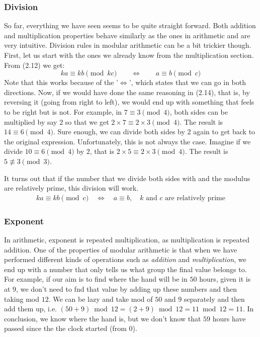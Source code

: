 \subsubsection{Division}
So far, everything we have seen seems to be quite straight forward. Both addition and multiplication properties behave similarly as the ones in arithmetic and are very intuitive. Division rules in modular arithmetic can be a bit trickier though. First, let us start with the ones we already know from the multiplication section.
From (2.12) we get:
\begin{equation}
ka\equiv kb \pmod {kc} \qquad  \iff  \qquad  a \equiv b  \pmod {c}
\end{equation}
Note that this works because of the '$\iff$', which states that we can go in both directions. Now, if we would have done the same reasoning in (2.14), that is, by reversing it (going from right to left), we would end up with something that feels to be right but is not. For example, in $7\equiv3 \pmod 4$, both sides can be multiplied by say $2$ so that we get $2\times 7 \equiv 2\times 3 \pmod 4$. The result is $14 \equiv 6 \pmod 4$. Sure enough, we can divide both sides by $2$ again to get back to the original expression. Unfortunately, this is not always the case. Imagine if we divide $10 \equiv 6 \pmod 4$ by $2$, that is $2\times 5 \equiv 2\times 3 \pmod 4$. The result is $5\not \equiv 3 \pmod 3$.

It turns out that if the number that we divide both sides with and the modulus are relatively prime, this division will work. 
\begin{eqnarray}
ka\equiv kb \pmod c \quad \iff \quad  a\equiv b, \quad \text{$k$ and $c$ are relatively prime}
\end{eqnarray}
\subsubsection{Exponent}
In arithmetic, exponent is repeated multiplication, as multiplication is repeated addition. One of the properties of modular arithmetic is that when we have performed different kinds of operations such as \textit{addition} and \textit{multiplication}, we end up with a number that only tells us what group the final value belongs to. For example, if our aim is to find where the hand will be in $50$ hours, given it is at $9$, we don't need to fnd that value by adding up these numbers and then taking mod $12$. We can be lazy and take mod of $50$ and $9$ separately and then add them up, i.e. $ (50+9)\bmod 12 = (2 + 9)\bmod 12 = 11 \bmod 12 = 11$. In conclusion, we know where the hand is, but we don't know that $59$ hours have passed since the the clock started (from $0$).


